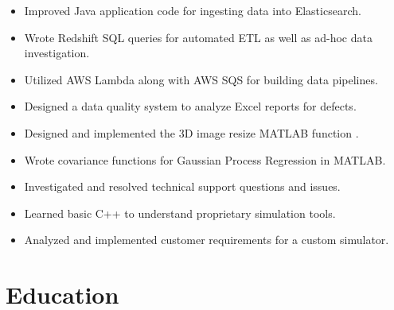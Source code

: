\documentclass[letterpaper]{resume}
\begin{document}
\begin{minipage}[t]{0.72\textwidth}
\begin{itemize}
\item Improved Java application code for ingesting data into Elasticsearch.
\item Wrote Redshift SQL queries for automated ETL as well as ad-hoc data investigation.
\item Utilized AWS Lambda along with AWS SQS for building data pipelines.
\item Designed a data quality system to analyze Excel reports for defects.
\end{itemize}

\sectionspace %


\begin{itemize}
\item Designed and implemented the 3D image resize MATLAB function .
\item Wrote covariance functions for Gaussian Process Regression in MATLAB.
\item Investigated and resolved technical support questions and issues.
\end{itemize}

\sectionspace %


\begin{itemize}
\item Learned basic C++ to understand proprietary simulation tools.
\item Analyzed and implemented customer requirements for a custom simulator.
\end{itemize}

\sectionspace %


\section{Education}


\end{minipage}
\end{document}
